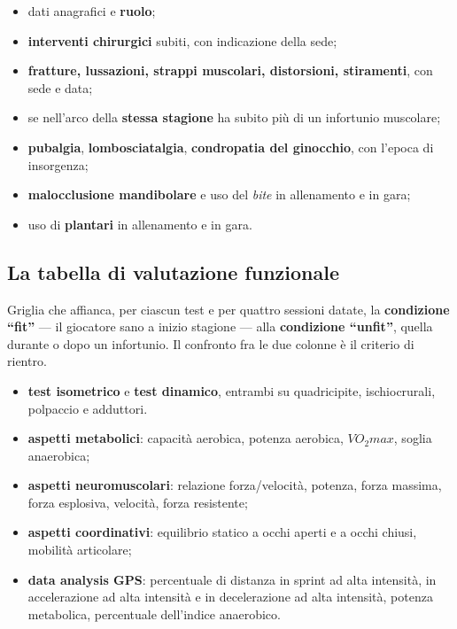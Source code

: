 \begin{itemize}
  \item dati anagrafici e \textbf{ruolo};
  \item \textbf{interventi chirurgici} subiti, con indicazione della sede;
  \item \textbf{fratture, lussazioni, strappi muscolari, distorsioni, stiramenti}, con sede e data;
  \item se nell'arco della \textbf{stessa stagione} ha subito più di un infortunio muscolare;
  \item \textbf{pubalgia}, \textbf{lombosciatalgia}, \textbf{condropatia del ginocchio}, con
    l'epoca di insorgenza;
  \item \textbf{malocclusione mandibolare} e uso del \textit{bite} in allenamento e in gara;
  \item uso di \textbf{plantari} in allenamento e in gara.
\end{itemize}

\subsection{La tabella di valutazione funzionale}

Griglia che affianca, per ciascun test e per quattro sessioni datate, la
\textbf{condizione ``fit''} --- il giocatore sano a inizio stagione --- alla \textbf{condizione
``unfit''}, quella durante o dopo un infortunio. Il confronto fra le due colonne è il criterio di
rientro.

\begin{itemize}
  \item \textbf{test isometrico} e \textbf{test dinamico}, entrambi su quadricipite, ischiocrurali,
    polpaccio e adduttori.
\end{itemize}

\begin{itemize}
  \item \textbf{aspetti metabolici}: capacità aerobica, potenza aerobica, $VO_2max$, soglia
    anaerobica;
  \item \textbf{aspetti neuromuscolari}: relazione forza/velocità, potenza, forza massima, forza
    esplosiva, velocità, forza resistente;
  \item \textbf{aspetti coordinativi}: equilibrio statico a occhi aperti e a occhi chiusi, mobilità
    articolare;
  \item \textbf{data analysis GPS}: percentuale di distanza in sprint ad alta intensità, in
    accelerazione ad alta intensità e in decelerazione ad alta intensità, potenza metabolica,
    percentuale dell'indice anaerobico.
\end{itemize}

